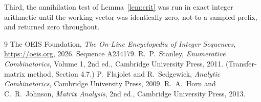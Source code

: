 \documentclass[11pt,a4paper]{article}
\theoremstyle{plain}
\theoremstyle{definition}
\begin{document}
Third, the annihilation test of Lemma~\ref{lem:crit} was run in exact integer arithmetic
until the working vector was identically zero, not to a sampled prefix, and returned zero
throughout.

\begin{thebibliography}{9}
 The OEIS Foundation, \emph{The On-Line Encyclopedia of Integer
Sequences}, \url{https://oeis.org}, 2026. Sequence A234179.
 R.~P.~Stanley, \emph{Enumerative Combinatorics}, Volume 1, 2nd ed.,
Cambridge University Press, 2011. (Transfer-matrix method, Section 4.7.)
 P.~Flajolet and R.~Sedgewick, \emph{Analytic Combinatorics}, Cambridge
University Press, 2009.
 R.~A.~Horn and C.~R.~Johnson, \emph{Matrix Analysis}, 2nd ed., Cambridge
University Press, 2013.
\end{thebibliography}
\end{document}

